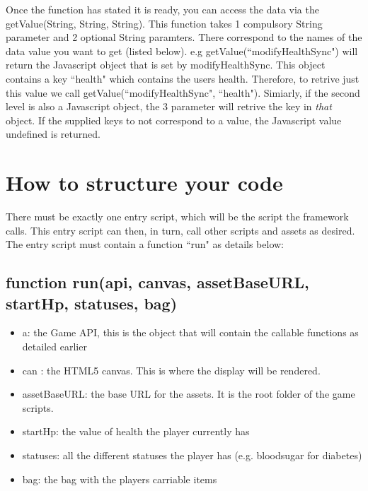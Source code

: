 \documentclass[a4paper,12pt]{article}
\begin{document}
Once the function has stated it is ready, you can access the data via the getValue(String, String, String). This function takes 1 compulsory String parameter and 2 optional String paramters. There correspond to the names of the data value you want to get (listed below). e.g getValue(``modifyHealthSync") will return the Javascript object that is set by modifyHealthSync. This object contains a key ``health" which contains the users health. Therefore, to retrive just this value we call getValue(``modifyHealthSync", ``health"). Simiarly, if the second level is also a Javascript object, the 3 parameter will retrive the key in \textit{that} object. If the supplied keys to not correspond to a value, the Javascript value undefined is returned.


\section{How to structure your code}
There must be exactly one entry script, which will be the script the framework calls. This entry script
can then, in turn, call other scripts and assets as desired. The entry script must contain a function ``run"
as details below:

\subsection*{function run(api, canvas, assetBaseURL, startHp, statuses, bag)}
\begin{itemize}
	\setlength\itemsep{0em}
	\item a: 			the Game API, this is the object that will contain the callable functions as detailed earlier
	\item can : 			the HTML5 canvas. This is where the display will be rendered.
	\item assetBaseURL:	the base URL for the assets. It is the root folder of the game scripts.
	\item startHp:		the value of health the player currently has
	\item statuses:		all the different statuses the player has (e.g. bloodsugar for diabetes)
	\item bag:			the bag with the players carriable items
\end{itemize}
\end{document}
